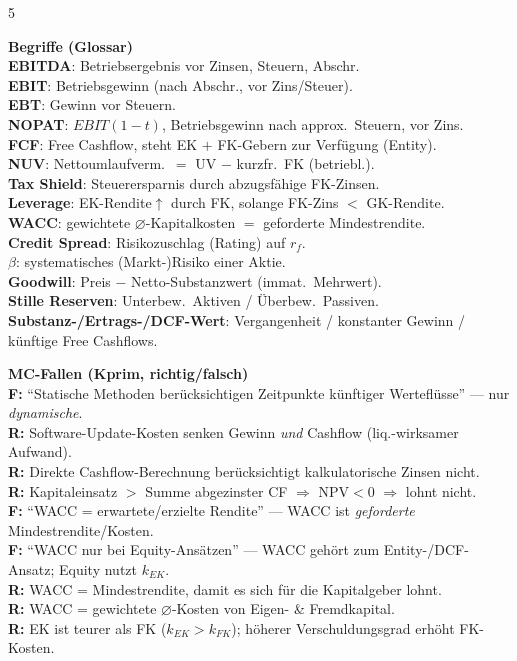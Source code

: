 \documentclass[10pt,a4paper,landscape]{extarticle}
\newcommand{\K}[1]{\textbf{\color{cB}#1}}
\newcommand{\R}[1]{\textbf{\color{red!72!black}#1}}
\begin{document}
\begin{multicols}{5}
\begin{tcolorbox}[colback=cBox,colframe=cA,boxrule=0.35pt,left=2.5pt,right=2.5pt,top=2pt,bottom=2pt,arc=1pt]
\textbf{Begriffe (Glossar)}\\
\K{EBITDA}: Betriebsergebnis vor Zinsen, Steuern, Abschr.\\
\K{EBIT}: Betriebsgewinn (nach Abschr., vor Zins/Steuer).\\
\K{EBT}: Gewinn vor Steuern.\\
\K{NOPAT}: $EBIT(1{-}t)$, Betriebsgewinn nach approx.\ Steuern, vor Zins.\\
\K{FCF}: Free Cashflow, steht EK $+$ FK-Gebern zur Verfügung (Entity).\\
\K{NUV}: Nettoumlaufverm.\ $=$ UV $-$ kurzfr.\ FK (betriebl.).\\
\K{Tax Shield}: Steuerersparnis durch abzugsfähige FK-Zinsen.\\
\K{Leverage}: EK-Rendite$\uparrow$ durch FK, solange FK-Zins $<$ GK-Rendite.\\
\K{WACC}: gewichtete $\varnothing$-Kapitalkosten $=$ geforderte Mindestrendite.\\
\K{Credit Spread}: Risikozuschlag (Rating) auf $r_f$.\\
\K{$\beta$}: systematisches (Markt-)Risiko einer Aktie.\\
\K{Goodwill}: Preis $-$ Netto-Substanzwert (immat.\ Mehrwert).\\
\K{Stille Reserven}: Unterbew.\ Aktiven / Überbew.\ Passiven.\\
\K{Substanz-/Ertrags-/DCF-Wert}: Vergangenheit / konstanter Gewinn / künftige Free Cashflows.
\end{tcolorbox}

\begin{tcolorbox}[colback=cWarn,colframe=red!55!black,boxrule=0.35pt,left=2.5pt,right=2.5pt,top=2pt,bottom=2pt,arc=1pt]
\textbf{MC-Fallen (Kprim, richtig/falsch)}\\
\R{F:} ``Statische Methoden berücksichtigen Zeitpunkte künftiger Werteflüsse'' — nur \emph{dynamische}.\\
\R{R:} Software-Update-Kosten senken Gewinn \emph{und} Cashflow (liq.-wirksamer Aufwand).\\
\R{R:} Direkte Cashflow-Berechnung berücksichtigt kalkulatorische Zinsen nicht.\\
\R{R:} Kapitaleinsatz $>$ Summe abgezinster CF $\Rightarrow$ NPV$<$0 $\Rightarrow$ lohnt nicht.\\
\R{F:} ``WACC = erwartete/erzielte Rendite'' — WACC ist \emph{geforderte} Mindestrendite/Kosten.\\
\R{F:} ``WACC nur bei Equity-Ansätzen'' — WACC gehört zum Entity-/DCF-Ansatz; Equity nutzt $k_{EK}$.\\
\R{R:} WACC = Mindestrendite, damit es sich für die Kapitalgeber lohnt.\\
\R{R:} WACC = gewichtete $\varnothing$-Kosten von Eigen- \& Fremdkapital.\\
\R{R:} EK ist teurer als FK ($k_{EK}>k_{FK}$); höherer Verschuldungsgrad erhöht FK-Kosten.
\end{tcolorbox}


\end{multicols}
\end{document}
